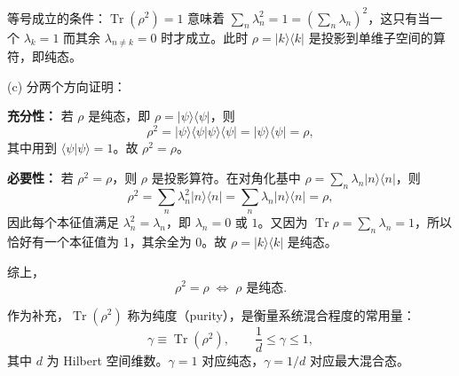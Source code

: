 \begin{solution}
等号成立的条件：$\operatorname{Tr}(\rho^2)=1$ 意味着 $\sum_n \lambda_n^2 = 1 = (\sum_n \lambda_n)^2$，这只有当一个 $\lambda_k = 1$ 而其余 $\lambda_{n\neq k} = 0$ 时才成立。此时 $\rho = |k\rangle\langle k|$ 是投影到单维子空间的算符，即纯态。

(c) 分两个方向证明：

\textbf{充分性：} 若 $\rho$ 是纯态，即 $\rho = |\psi\rangle\langle\psi|$，则
\[
\rho^2 = |\psi\rangle\langle\psi|\psi\rangle\langle\psi| = |\psi\rangle\langle\psi| = \rho,
\]
其中用到 $\langle\psi|\psi\rangle=1$。故 $\rho^2 = \rho$。

\textbf{必要性：} 若 $\rho^2 = \rho$，则 $\rho$ 是投影算符。在对角化基中 $\rho = \sum_n \lambda_n |n\rangle\langle n|$，则
\[
\rho^2 = \sum_n \lambda_n^2 |n\rangle\langle n| = \sum_n \lambda_n |n\rangle\langle n| = \rho,
\]
因此每个本征值满足 $\lambda_n^2 = \lambda_n$，即 $\lambda_n = 0$ 或 $1$。又因为 $\operatorname{Tr}\rho = \sum_n \lambda_n = 1$，所以恰好有一个本征值为 1，其余全为 0。故 $\rho = |k\rangle\langle k|$ 是纯态。

综上，
\[
\boxed{\rho^2 = \rho \;\Longleftrightarrow\; \rho \text{ 是纯态}.}
\]

作为补充，$\operatorname{Tr}(\rho^2)$ 称为纯度（purity），是衡量系统混合程度的常用量：
\[
\gamma \equiv \operatorname{Tr}(\rho^2),\qquad \frac{1}{d} \le \gamma \le 1,
\]
其中 $d$ 为 Hilbert 空间维数。$\gamma=1$ 对应纯态，$\gamma=1/d$ 对应最大混合态。
\end{solution}

